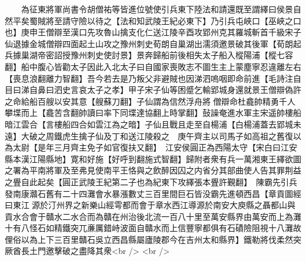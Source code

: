 　　為征東將軍尚書令胡僧祐等皆進位號使引兵東下陸法和請還既至謂繹曰侯景自然平矣蜀賊將至請守險以待之【法和知武陵王紀必東下】乃引兵屯峽口【巫峽之口也】庚申王僧辯至漢口先攻魯山擒支化仁送江陵辛酉攻郢州克其羅城斬首千級宋子仙退據金城僧辯四面起土山攻之豫州刺史荀朗自巢湖出濡須邀景破其後軍【荀朗起兵據巢湖帝密詔授豫州刺史使討景】景奔歸船前後相失太子船入樅陽浦【樅七容翻】船中腹心皆勸太子因此入北太子曰自國家喪敗志不圖生主上蒙塵寧忍違離左右【喪息浪翻離力智翻】吾今若去是乃叛父非避賊也因涕泗嗚咽即命前進【毛詩注自目曰涕自鼻曰泗史言哀太子之孝】甲子宋子仙等困蹙乞輸郢城身還就景王僧辯偽許之命給船百艘以安其意【艘蘇刀翻】子仙謂為信然浮舟將僧辯命杜龕帥精勇千人攀堞而上【龕苦含翻帥讀曰率下同堞達協翻上時掌翻】鼔譟奄進水軍主宋遥帥樓船暗江雲合【言樓船四合如雲江為之暗】子仙且戰且走至自楊浦【白楊浦蓋去郢城未遠】大破之周鐵虎生擒子仙及丁和送江陵殺之　庚午齊主以司馬子如高祖之舊復以為太尉【是年三月齊主免子如官復扶又翻】　江安侯圓正為西陽太守【宋白曰江安縣本漢江陽縣地】寛和好施【好呼到翻施式智翻】歸附者衆有兵一萬湘東王繹欲圖之署為平南將軍及至弗見使南平王恪與之飲醉因囚之内省分其部曲使人告其罪荆益之舋自此起矣【圓正武陵王紀第二子也為紀東下攻繹張本舋許覲翻】　陳霸先引兵發南康灨石舊有二十四灘會水暴漲數丈三百里間巨石皆没霸先進頓西昌【章貢圖經曰東江源於汀州界之新樂山經雩都而會于章水西江導源於南安大庾縣之聶都山與貢水合會于贛水二水合而為贛在州治後北流一百八十里至萬安縣界由萬安而上為灘十有八怪石如精鐵突兀亷厲錯峙波面自贛水而上信豐寧都俱有石磧險阻視十八灘故俚俗以為上下三百里贛石吳立西昌縣屬廬陵郡今在吉州太和縣界】鐵勒將伐柔然突厥酋長土門邀擊破之盡降其衆<br />
<br />
